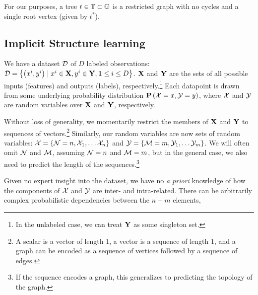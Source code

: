 
For our purposes, a tree $t\in{\mathbb{T}}\subset{\mathbb{G}}$ is a restricted graph 
with no cycles and a single root vertex (given by $t^*$).


\subsection{Implicit Structure learning}

We have a dataset ${\mathcal{D}}$ of $D$ labeled observations: 
${\mathcal{D}}=\left\{\left(x^i,y^i\right)\mid x^i\in{\mathbf{X}},y^i\in{\mathbf{Y}},\bm{1}\leq{}i \leq{} 
D\right\}$. ${\mathbf{X}}$ and ${\mathbf{Y}}$ are the sets of all possible inputs (features) and 
outputs (labels), respectively.\footnote{In the unlabeled case, we can treat 
${\mathbf{Y}}$ as some singleton set.} Each datapoint is drawn from some underlying 
probability distribution ${\mathbf{P}}\left(\mathbf{{\mathcal{X}}}=x,\mathbf{{\mathcal{Y}}}=y\right)$, where $\mathbf{{\mathcal{X}}}$ and $\mathbf{{\mathcal{Y}}}$ are 
random variables over ${\mathbf{X}}$ and ${\mathbf{Y}}$, respectively.

Without loss of generality, we momentarily restrict the members of ${\mathbf{X}}$ and 
${\mathbf{Y}}$ to sequences of vectors.\footnote{A scalar is a vector of length $1$, 
	a vector is a sequence of length $1$, and a graph can be encoded as a sequence 
of vertices followed by a sequence of edges.} Similarly, our random variables 
are now sets of random variables:
$\mathbf{{\mathcal{X}}}=\left\{\mathbf{{\mathcal{N}}}=n,\mathbf{{\mathcal{X}}}_{1},\ldots\mathbf{{\mathcal{X}}}_{n}\right\}$ 
and 
$\mathbf{{\mathcal{Y}}}=\left\{\mathbf{{\mathcal{M}}}=m,\mathbf{{\mathcal{Y}}}_{1},\ldots\mathbf{{\mathcal{Y}}}_{m}\right\}$.  
We will often omit $\mathbf{{\mathcal{N}}}$ and $\mathbf{{\mathcal{M}}}$, assuming 
$\mathbf{{\mathcal{N}}}=n$ and $\mathbf{{\mathcal{M}}}=m$, but in the general case, 
we also need to predict the length of the sequences.\footnote{If the sequence 
encodes a graph, this generalizes to predicting the topology of the graph.}

Given no expert insight into the dataset, we have no \textit{a priori} knowledge 
of how the components of $\mathbf{{\mathcal{X}}}$ and $\mathbf{{\mathcal{Y}}}$ are inter- and 
intra-related.  There can be arbitrarily complex probabilistic dependencies 
between the $n+m$ elements, 

